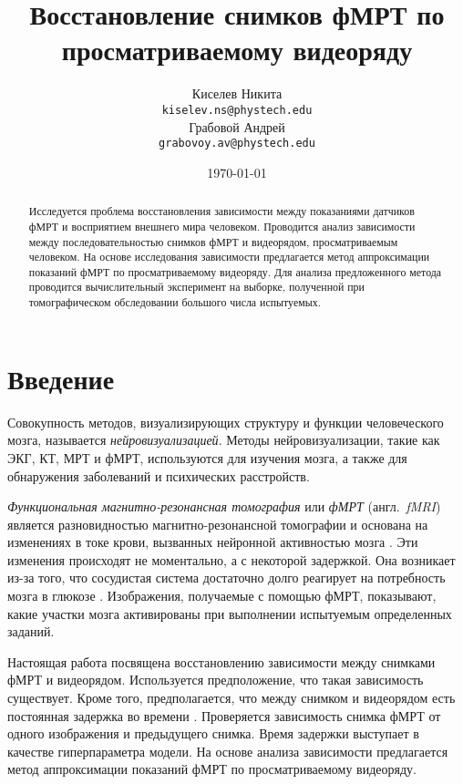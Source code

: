 \documentclass[a4paper, 12pt]{article}
\title{Восстановление снимков фМРТ по просматриваемому видеоряду}
\author{
	Киселев Никита \\
	\texttt{kiselev.ns@phystech.edu} \\
	\And
	Грабовой Андрей \\
	\texttt{grabovoy.av@phystech.edu}
}
\date{\today}
\begin{document}
\maketitle

\begin{abstract}
	
	Исследуется проблема восстановления зависимости между показаниями датчиков фМРТ
	и восприятием внешнего мира человеком.
	Проводится анализ зависимости между последовательностью снимков фМРТ и видеорядом,
	просматриваемым человеком.
	На основе исследования зависимости предлагается метод аппроксимации показаний фМРТ по
	просматриваемому видеоряду.
	Для анализа предложенного метода проводится вычислительный эксперимент на 
	выборке, полученной при томографическом обследовании большого числа испытуемых.

\end{abstract}



\section{Введение}

	Совокупность методов, визуализирующих структуру и функции человеческого мозга,
	называется \textit{нейровизуализацией}. Методы нейровизуализации, такие как ЭКГ, КТ, МРТ и фМРТ, 
	используются для изучения мозга, а также для обнаружения заболеваний и психических расстройств. 

	\textit{Функциональная магнитно-резонансная томография} или \textit{фМРТ} (англ.~\textit{fMRI}) 
	является разновидностью магнитно-резонансной томографии и основана на изменениях в токе крови, 
	вызванных нейронной активностью мозга \citep{Glover2011}. 
	Эти изменения происходят не моментально, а с некоторой задержкой.
	Она возникает из-за того, что сосудистая система достаточно долго реагирует 
	на потребность мозга в глюкозе \citep{Logothetis2003}. Изображения, получаемые с помощью фМРТ,
	показывают, какие участки мозга активированы при выполнении испытуемым определенных заданий.

	Настоящая работа посвящена восстановлению зависимости между снимками фМРТ и видеорядом.
	Используется предположение, что такая зависимость существует.
	Кроме того, предполагается, что между снимком и видеорядом есть постоянная задержка во времени
	\citep{Logothetis2003}.
	Проверяется зависимость снимка фМРТ от одного изображения и предыдущего снимка.
	Время задержки выступает в качестве гиперпараметра модели.
	На основе анализа зависимости предлагается метод аппроксимации показаний фМРТ по
	просматриваемому видеоряду.
\end{document}
